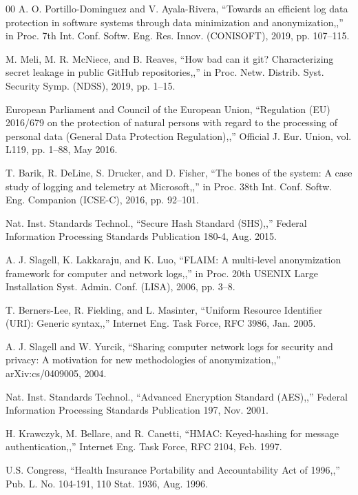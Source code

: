 \documentclass[conference]{IEEEtran}
\begin{document}
\begin{thebibliography}{00}
A. O. Portillo-Dominguez and V. Ayala-Rivera, ``Towards an efficient log data protection in software systems through data minimization and anonymization,,'' in Proc. 7th Int. Conf. Softw. Eng. Res. Innov. (CONISOFT), 2019, pp. 107–115.

M. Meli, M. R. McNiece, and B. Reaves, ``How bad can it git? Characterizing secret leakage in public GitHub repositories,,'' in Proc. Netw. Distrib. Syst. Security Symp. (NDSS), 2019, pp. 1–15.

European Parliament and Council of the European Union, ``Regulation (EU) 2016/679 on the protection of natural persons with regard to the processing of personal data (General Data Protection Regulation),,'' Official J. Eur. Union, vol. L119, pp. 1–88, May 2016.

T. Barik, R. DeLine, S. Drucker, and D. Fisher, ``The bones of the system: A case study of logging and telemetry at Microsoft,,'' in Proc. 38th Int. Conf. Softw. Eng. Companion (ICSE-C), 2016, pp. 92–101.

Nat. Inst. Standards Technol., ``Secure Hash Standard (SHS),,'' Federal Information Processing Standards Publication 180-4, Aug. 2015.

A. J. Slagell, K. Lakkaraju, and K. Luo, ``FLAIM: A multi-level anonymization framework for computer and network logs,,'' in Proc. 20th USENIX Large Installation Syst. Admin. Conf. (LISA), 2006, pp. 3–8.

T. Berners-Lee, R. Fielding, and L. Masinter, ``Uniform Resource Identifier (URI): Generic syntax,,'' Internet Eng. Task Force, RFC 3986, Jan. 2005.

A. J. Slagell and W. Yurcik, ``Sharing computer network logs for security and privacy: A motivation for new methodologies of anonymization,,'' arXiv:cs/0409005, 2004.

Nat. Inst. Standards Technol., ``Advanced Encryption Standard (AES),,'' Federal Information Processing Standards Publication 197, Nov. 2001.

H. Krawczyk, M. Bellare, and R. Canetti, ``HMAC: Keyed-hashing for message authentication,,'' Internet Eng. Task Force, RFC 2104, Feb. 1997.

U.S. Congress, ``Health Insurance Portability and Accountability Act of 1996,,'' Pub. L. No. 104-191, 110 Stat. 1936, Aug. 1996.


\end{thebibliography}
\end{document}
